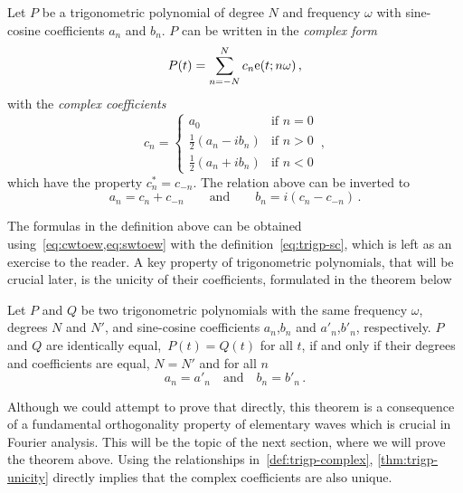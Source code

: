 \begin{definition}
  \label{def:trigp-complex}
  Let $P$ be a trigonometric polynomial of degree $N$ and frequency $\omega$ with
  sine-cosine coefficients $a_n$ and $b_n$. $P$ can be written in the \emph{complex form}
  \begin{equation}
    P(t)=\sum_{n=-N}^{N}c_n\mathrm{e}(t;n\omega)\,,\label{eq:trigp-complex}
  \end{equation}
  with the \emph{complex coefficients}
  \begin{equation}
    c_n =
    \begin{cases}
      a_0 &\text{if~}n=0\\
      \frac{1}{2}(a_n-ib_n)&\text{if~}n>0\\
      \frac{1}{2}(a_n+ib_n)&\text{if~}n<0
    \end{cases}
    \,,\label{eq:ab-to-c}
  \end{equation}
  which have the property $c_n^*=c_{-n}$. The relation above can be inverted to
  \begin{equation}
    a_n=c_n+c_{-n}\qquad\text{and}\qquad
    b_n=i(c_n-c_{-n})\,.
  \end{equation}
\end{definition}
The formulas in the definition above can be obtained using~\cref{eq:cwtoew,eq:swtoew} with
the definition~\cref{eq:trigp-sc}, which is left as an exercise to the reader. A key
property of trigonometric polynomials, that will be crucial later, is the unicity of their
coefficients, formulated in the theorem below
\begin{theorem}
  \label{thm:trigp-unicity}
  Let $P$ and $Q$ be two trigonometric polynomials with the same frequency $\omega$,
  degrees $N$ and $N'$, and sine-cosine coefficients $a_n$,$b_n$ and $a'_n$,$b'_n$,
  respectively. $P$ and $Q$ are identically equal,~\ie $P(t)=Q(t)$ for all $t$, if and
  only if their degrees and coefficients are equal, \ie $N=N'$ and for all $n$
  \begin{equation}
    a_n=a'_n\quad\text{and}\quad b_n=b'_n\,.
  \end{equation}
\end{theorem}
Although we could attempt to prove that directly, this theorem is a consequence of a
fundamental orthogonality property of elementary waves which is crucial in Fourier
analysis. This will be the topic of the next section, where we will prove the theorem
above. Using the relationships in~\cref{def:trigp-complex}, \cref{thm:trigp-unicity}
directly implies that the complex coefficients are also unique.

